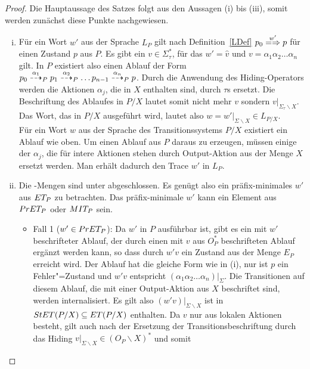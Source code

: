 \begin{proof}
  Die Hauptaussage des Satzes folgt aus den Aussagen (i) bis (iii), somit
  werden zunächst diese Punkte nachgewiesen.
  \begin{enumerate}[(i)]
    \item Für ein Wort $w'$ aus der Sprache $L_P$ gilt nach
      Definition~\ref{LDef} $p_0 \weakmay[w'] p$ für einen Zustand $p$ aus $P$.
      Es gibt ein $v\in \Sigma_{\tau} ^*$, für das $w' = \hat{v}$ und $v =
      \alpha _1\alpha _2\dots \alpha _n$ gilt. In $P$ existiert also einen
      Ablauf der Form $p_0 \may[\alpha _1]_P p_1 \may[\alpha _2]_P \dots
      p_{n-1} \may[\alpha _n]_P p$. Durch die Anwendung des Hiding-Operators
      werden die Aktionen $\alpha _j$, die in $X$ enthalten sind, durch $\tau$s
      ersetzt. Die Beschriftung des Ablaufes in $P/X$ lautet somit nicht mehr
      $v$ sondern $v|_{\Sigma _{\tau}\backslash X}$. Das Wort, das in $P/X$
      ausgeführt wird, lautet also $w=w'|_{\Sigma\backslash X}\in L_{P/X}$.\\
      Für ein Wort $w$ aus der Sprache des Transitionssystems $P/X$ existiert
      ein Ablauf wie oben. Um einen Ablauf aus $P$ daraus zu erzeugen, müssen
      einige der $\alpha _j$, die für intere Aktionen stehen durch
      Output-Aktion aus der Menge $X$ ersetzt werden. Man erhält dadurch den
      Trace $w'$ in $L_P$.
    \item Die \ET{}-Mengen sind unter \cont{} abgeschlossen. Es genügt also ein
      präfix-minimales $w'$ aus $ET _{P}$ zu betrachten. Das präfix-minimale
      $w'$ kann ein Element aus $PrET _P$ oder $MIT _P$ sein.
      \begin{itemize}
        \item Fall 1 ($w'\in PrET _P$): Da $w'$ in $P$ ausführbar ist, gibt es
          ein mit $w'$ beschrifteter Ablauf, der durch einen mit $v$ aus
          $O_P^*$ beschrifteten Ablauf ergänzt werden kann, so dass durch $w'v$
          ein Zustand aus der Menge $E_P$ erreicht wird. Der Ablauf hat die
          gleiche Form wie in (i), nur ist $p$ ein Fehler"=Zustand und $w'v$
          entspricht $(\alpha _1\alpha _2\dots\alpha _n)|_{\Sigma}$. Die
          Transitionen auf diesem Ablauf, die mit einer Output-Aktion aus $X$
          beschriftet sind, werden internalisiert. Es gilt also
          $(w'v)|_{\Sigma\backslash X}$ ist in $StET (P/X) \subseteq ET (P/X)$
          enthalten. Da $v$ nur aus lokalen Aktionen besteht, gilt auch nach
          der Ersetzung der Transitionsbeschriftung durch das Hiding
          $v|_{\Sigma\backslash X}\in (O_P\backslash X)^*$ und somit

\end{itemize}
\end{enumerate}
\end{proof}
